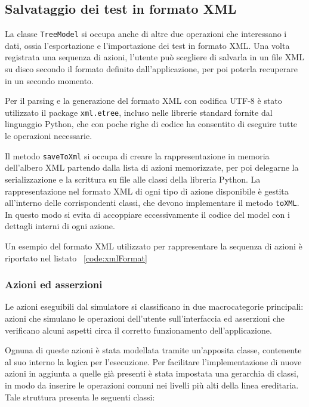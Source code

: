 
 
\subsection{Salvataggio dei test in formato XML}

La classe \verb|TreeModel| si occupa anche di altre due operazioni che interessano i dati, ossia l'esportazione e l'importazione dei test in formato XML. Una volta registrata una sequenza di azioni, l'utente può scegliere di salvarla in un file XML su disco secondo il formato definito dall'applicazione, per poi poterla recuperare in un secondo momento.

Per il parsing e la generazione del formato XML con codifica UTF-8 è stato utilizzato il package \verb|xml.etree|, incluso nelle librerie standard fornite dal linguaggio Python, che con poche righe di codice ha consentito di eseguire tutte le operazioni necessarie.

Il metodo \verb|saveToXml| si occupa di creare la rappresentazione in memoria dell'albero XML partendo dalla lista di azioni memorizzate, per poi delegarne la serializzazione e la scrittura su file alle classi della libreria Python. La rappresentazione nel formato XML di ogni tipo di azione disponibile è gestita all'interno delle corrispondenti classi, che devono implementare il metodo \verb|toXML|. In questo modo si evita di accoppiare eccessivamente il codice del model con i dettagli interni di ogni azione.

Un esempio del formato XML utilizzato per rappresentare la sequenza di azioni è riportato nel listato ~\ref{code:xmlFormat} 



\subsubsection{Azioni ed asserzioni}

Le azioni eseguibili dal simulatore si classificano in due macrocategorie principali: azioni che simulano le operazioni dell'utente sull'interfaccia ed asserzioni che verificano alcuni aspetti circa il corretto funzionamento dell'applicazione.

Ognuna di queste azioni è stata modellata tramite un'apposita classe, contenente al suo interno la logica per l'esecuzione. Per facilitare l'implementazione di nuove azioni in aggiunta a quelle già presenti è stata impostata una gerarchia di classi, in modo da inserire le operazioni comuni nei livelli più alti della linea ereditaria. Tale struttura presenta le seguenti classi:

